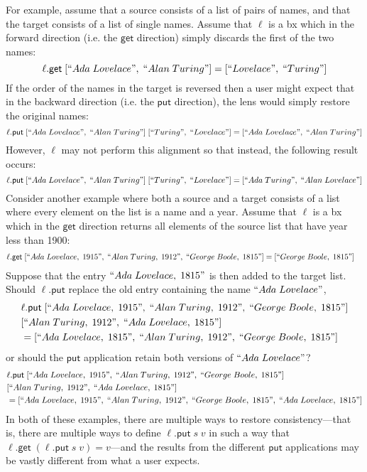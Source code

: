 \documentclass[acmsmall,review,anonymous]{acmart}\settopmatter{printfolios=true,printccs=false,printacmref=false}
\theoremstyle{definition}
\newcommand{\kw}[1]{\ensuremath{\mathsf{#1}}\xspace}
\newcommand{\get}{\ensuremath{\kw{get}}\xspace}
\newcommand{\pput}{\ensuremath{\kw{put}}\xspace}
\begin{document}
For example, assume that a source consists of a list of pairs of names, and that the target consists of a list of single names. Assume that $\ell$ is a bx which in the forward direction (i.e. the \get direction) simply discards the first of the two names:
$$\ell.\get \; [``Ada \; Lovelace", \; ``Alan \; Turing"] = [``Lovelace", \; ``Turing"]$$
If the order of the names in the target is reversed then a user might expect that in the backward direction (i.e. the \pput direction), the lens would simply restore the original names:
$$\ell.\pput \; [``Ada \; Lovelace", \; ``Alan \; Turing"] \; [``Turing", \; ``Lovelace"] = [``Ada \; Lovelace", \; ``Alan \; Turing"]$$
However, $\ell$ may not perform this alignment so that instead, the following result occurs:
$$\ell.\pput \; [``Ada \; Lovelace", \; ``Alan \; Turing"] \; [``Turing", \; ``Lovelace"] = [``Ada \; Turing", \; ``Alan \; Lovelace"]$$
Consider another example where both a source and a target consists of a list where every element on the list is a name and a year. Assume that $\ell$ is a bx which in the \get direction returns all elements of the source list that have year less than 1900:
\begin{align*}
&\ell.\get \; [``Ada \; Lovelace, \; 1915", \; ``Alan \; Turing, \; 1912", \; ``George \; Boole, \; 1815"] = [``George \; Boole, \; 1815"]
\end{align*}
Suppose that the entry $``Ada \; Lovelace, \; 1815"$ is then added to the target list. Should $\ell.\pput$ replace the old entry containing the name $``Ada \; Lovelace"$,
\begin{align*}
&\ell.\pput \; [``Ada \; Lovelace, \; 1915", \; ``Alan \; Turing, \; 1912", \; ``George \; Boole, \; 1815"]\\
&[``Alan \; Turing, \; 1912", \; ``Ada \; Lovelace, \; 1815"] \\
&= [``Ada \; Lovelace, \; 1815", \; ``Alan \; Turing, \; 1912", \; ``George \; Boole, \; 1815"]
\end{align*}
or should the \pput application retain both versions of $``Ada \; Lovelace"$?
\begin{align*}
&\ell.\pput \; [``Ada \; Lovelace, \; 1915", \; ``Alan \; Turing, \; 1912", \; ``George \; Boole, \; 1815"] \\
& [``Alan \; Turing, \; 1912", \; ``Ada \; Lovelace, \; 1815"]\\
&= [``Ada \; Lovelace, \; 1915", \; ``Alan \; Turing, \; 1912", \; ``George \; Boole, \; 1815", \; ``Ada \; Lovelace, \; 1815"]
\end{align*}
In both of these examples, there are multiple ways to restore consistency---that is, there are multiple ways to define $\ell.\pput \; s \; v$ in such a way that $\ell.\get \; (\ell.\pput \; s \; v) = v$---and the results from the different \pput applications may be vastly different from what a user expects. 
\end{document}
